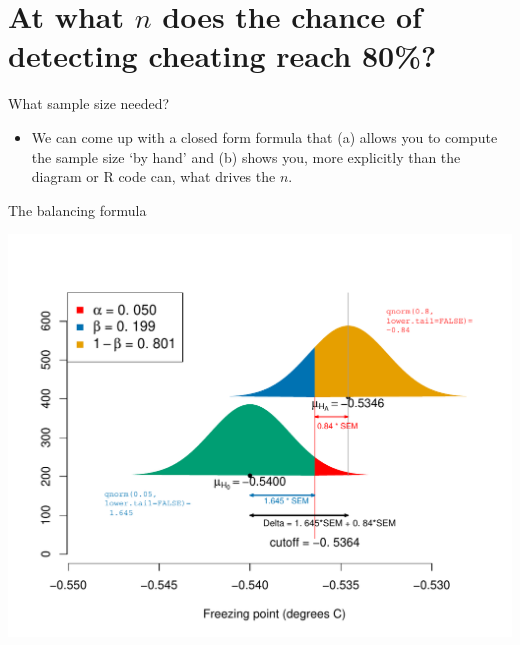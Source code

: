 \documentclass[10pt,handout]{beamer}\usepackage[]{graphicx}\usepackage[]{color}
\makeatletter
\def\maxwidth{ %
  \ifdim\Gin@nat@width>\linewidth
    \linewidth
  \else
    \Gin@nat@width
  \fi
}
\newenvironment{knitrout}{}{} %
\makeatother
\begin{document}
\section{At what $n$ does the chance of detecting cheating reach 80\%?}

\begin{frame}{What sample size needed?}
	
	\begin{itemize}
		\item We can come up with a closed form formula that (a) allows you to compute the sample size `by hand' and (b) shows you, more explicitly than the diagram or R code can, what drives the $n$.
		
	\end{itemize}
	
\end{frame}

\begin{frame}[fragile]{The balancing formula}
\begin{knitrout}\tiny
{}\color{fgcolor}

{\centering \includegraphics[width=\maxwidth]{figure/unnamed-chunk-14-1} 

}



\end{knitrout}
\end{frame}
\end{document}
